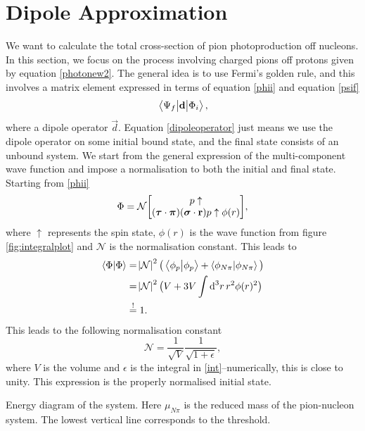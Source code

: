 \section{Dipole Approximation}\label{sec:dipoleapprox}
We want to calculate the total cross-section of pion photoproduction off nucleons. In this section, we focus on the process involving charged pions off protons given by equation \eqref{photonew2}. The general idea is to use Fermi's golden rule, and this involves a matrix element expressed in terms of equation \eqref{phii} and equation \eqref{psif}
\begin{equation}\label{dipoleoperator}
	\mel{\Psi_f}{\bm{\mathrm{d}}}{\Phi_i},
\end{equation}
where a dipole operator $\vec{d}$. Equation \eqref{dipoleoperator} just means we use the dipole operator on some initial bound state, and the final state consists of an unbound system. We start from the general expression of the multi-component wave function and impose a normalisation to both the initial and final state. Starting from \eqref{phii}
\begin{align}\label{finalphi}
	\Phi = \mathcal{N} \mqty[p\uparrow \\ (\vec{\tau}\cdot \vec{\pi})(\vec{\sigma}\cdot \vec{r})p\uparrow \phi(r)],
\end{align}
where $\uparrow$ represents the spin state, $\phi(r)$ is the wave function from figure \ref{fig:integralplot} and $\mathcal{N}$ is the normalisation constant. This leads to
\begin{align}
	\braket{\Phi}{\Phi} &= \abs{\mathcal{N}}^2 \big( \braket{\phi_p}{\phi_p}+ \braket{\phi_{N\pi}}{\phi_{N\pi}} \big) \\
	&= \abs{\mathcal{N}}^2 \big( V+3V\int \text{d}^3r \, r^2 \phi(r)^2 \big)\label{int} \\
	&\stackrel{!}{=} 1.
\end{align} 
This leads to the following normalisation constant
\begin{equation}
	\mathcal{N} = \frac{1}{\sqrt{V}}\frac{1}{\sqrt{1+\epsilon}},
\end{equation}
where $V$ is the volume and $\epsilon$ is the integral in \eqref{int}--numerically, this is close to unity. This expression is the properly normalised initial state. 
\begin{marginfigure}
	\centering
	
	\caption{Energy diagram of the system. Here $\mu_{N\pi}$ is the reduced mass of the pion-nucleon system. The lowest vertical line corresponds to the threshold.}
	\label{fig:qenergy}
\end{marginfigure}
